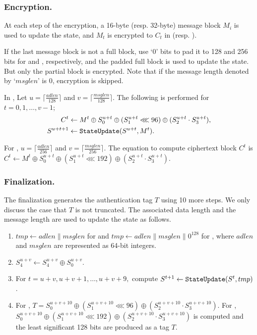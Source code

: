 \subsubsection{Encryption.}
At each step of the encryption, a 16-byte (resp. 32-byte) message block $M_i$ is used to update the state, and $M_t$ is encrypted to $C_t$ in  (resp. ).

If the last message block is not a full block, use `0' bits to pad it to 128 and 256 bits for  and , respectively, and the padded full block is used to update the state. But only the partial block is encrypted. Note that if the message length denoted by `$msglen$' is 0, encryption is skipped.

In , Let $u = \lceil \frac{adlen}{128} \rceil$ and $v = \lceil \frac{msglen}{128} \rceil$. The following is performed for $t=0, 1, \ldots, v-1$;
\begin{align*}
C^t &\leftarrow M^t \oplus S^{u+t}_0 \oplus (S^{u+t}_1 \lll 96) \oplus (S^{u+t}_2 \cdot S^{u+t}_3),\\
S^{u+t+1} &\leftarrow {\tt StateUpdate}(S^{u+t},M^t).
\end{align*}

For , $u = \lceil \frac{adlen}{256} \rceil$ and $v = \lceil \frac{msglen}{256} \rceil$. The equation to compute ciphertext block $C^t$ is $C^t \leftarrow M^t \oplus S^{u+t}_0 \oplus (S^{u+t}_1 \lll 192) \oplus (S^{u+t}_2 \cdot S^{u+t}_3)$.

\subsubsection{Finalization.}
The finalization generates the authentication tag $T$ using 10 more steps. We only discuss the case that $T$ is not truncated. The associated data length and the message length are used to update the state as follows.
\begin{enumerate}
\item $tmp \leftarrow adlen\|msglen$ for  and $tmp \leftarrow adlen\|msglen\|0^{128}$ for , where $adlen$ and $msglen$ are represented as 64-bit integers.
\item $S^{u+v}_4 \leftarrow S^{u+v}_4 \oplus S^{u+v}_0.$
\item For $t = u+v, u+v+1, \ldots, u+v+9,$ compute
$S^{t+1} \leftarrow {\tt StateUpdate} (S^t, tmp)$.
\item For , $T = S^{u+v+10}_0 \oplus (S^{u+v+10}_1 \lll 96) \oplus ( S^{u+v+10}_2 \cdot S^{u+v+10}_3)$. For , $S^{u+v+10}_0 \oplus (S^{u+v+10}_1 \lll 192) \oplus ( S^{u+v+10}_2 \cdot S^{u+v+10}_3)$ is computed and the least significant 128 bits are produced as a tag $T$.
\end{enumerate}


